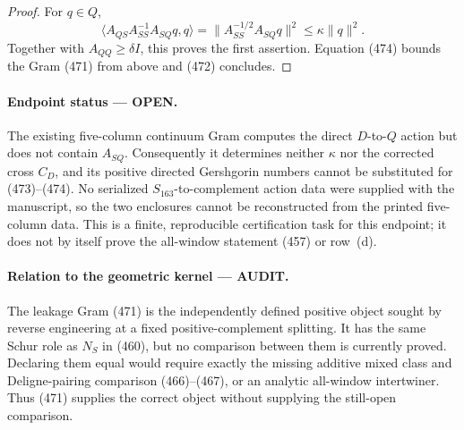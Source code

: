 \documentclass[11pt]{article}
\newcommand{\OPEN}{\textcolor{red!70!black}{\textbf{OPEN}}}
\newcommand{\AUDIT}{\textcolor{orange!75!black}{\textbf{AUDIT}}}
\begin{document}
\begin{proof}
For \(q\in Q\),
\[
 \langle A_{QS}A_{SS}^{-1}A_{SQ}q,q\rangle
 =\|A_{SS}^{-1/2}A_{SQ}q\|^2\le\kappa\|q\|^2.
\]
Together with \(A_{QQ}\ge\delta I\), this proves the first assertion.
Equation (474) bounds the Gram (471) from above and (472) concludes.
\end{proof}

\paragraph{Endpoint status --- \OPEN.}
The existing five-column continuum Gram computes the direct \(D\)-to-\(Q\)
action but does not contain \(A_{SQ}\).  Consequently it determines neither
\(\kappa\) nor the corrected cross \(C_D\), and its positive directed
Gershgorin numbers cannot be substituted for (473)--(474).  No serialized
\(S_{163}\)-to-complement action data were supplied with the manuscript, so
the two enclosures cannot be reconstructed from the printed five-column
data.  This is a finite, reproducible certification task for this endpoint;
it does not by itself prove the all-window statement (457) or row~(d).

\paragraph{Relation to the geometric kernel --- \AUDIT.}
The leakage Gram (471) is the independently defined positive object sought
by reverse engineering at a fixed positive-complement splitting.  It has
the same Schur role as \(N_S\) in (460), but no comparison between them is
currently proved.  Declaring them equal would require exactly the missing
additive mixed class and Deligne-pairing comparison (466)--(467), or an
analytic all-window intertwiner.  Thus (471) supplies the correct object
without supplying the still-open comparison.
\end{document}
